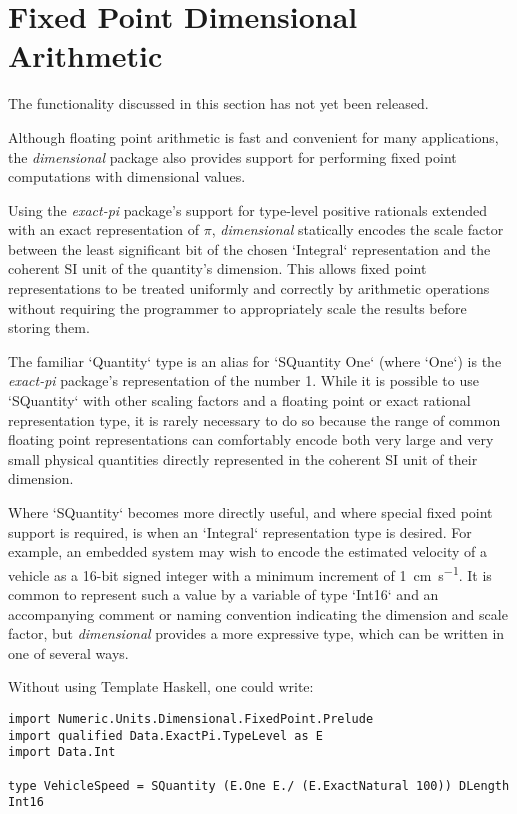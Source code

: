 \documentclass[11pt]{report}
\newcommand{\packagename}[1]{\textit{#1}}
\newcommand{\thispackage}{\packagename{dimensional}}
\newcommand{\prerelease}{\begin{framed}
The functionality discussed in this section has not yet been released.
\end{framed}}
\begin{document}
\chapter{Fixed Point Dimensional Arithmetic}

\prerelease{}

Although floating point arithmetic is fast and convenient for many applications, the \thispackage{} package also provides
support for performing fixed point computations with dimensional values.

Using the \packagename{exact-pi} package's support for type-level positive rationals extended with an exact representation
of $ \pi $, \thispackage{} statically encodes the scale factor between the least significant bit of the chosen `Integral`
representation and the coherent SI unit of the quantity's dimension. This allows fixed point representations to be
treated uniformly and correctly by arithmetic operations without requiring the programmer to appropriately scale the results
before storing them.

The familiar `Quantity` type is an alias for `SQuantity One` (where `One`) is the \packagename{exact-pi}
package's representation of the number 1. While it is possible to use `SQuantity` with other scaling factors and a
floating point or exact rational representation type, it is rarely necessary to do so because the range of common floating
point representations can comfortably encode both very large and very small physical quantities directly represented in the
coherent SI unit of their dimension.

Where `SQuantity` becomes more directly useful, and where special fixed point support is required, is when an
`Integral` representation type is desired. For example, an embedded system may wish to encode the estimated
velocity of a vehicle as a 16-bit signed integer with a minimum increment of \SI{1}{\centi\meter\per\second}. It is common
to represent such a value by a variable of type `Int16` and an accompanying comment or naming convention indicating
the dimension and scale factor, but \thispackage{} provides a more expressive type, which can be written in one of several ways.

Without using Template Haskell, one could write:

\begin{lstlisting}
import Numeric.Units.Dimensional.FixedPoint.Prelude
import qualified Data.ExactPi.TypeLevel as E
import Data.Int

type VehicleSpeed = SQuantity (E.One E./ (E.ExactNatural 100)) DLength Int16
\end{lstlisting}
\end{document}
